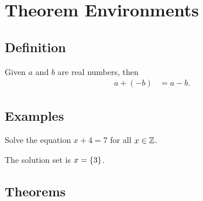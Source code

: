 \chapter{Theorem Environments}

\section{Definition}

\begin{definition}
\label{0000}
Given \( a \) and \( b \) are real numbers, then\cite{wolframMathworld-list}
\cite{Olson2021}
\begin{align*}
    a + (-b) &= a - b.
\end{align*}
\end{definition}

\section{Examples}

\begin{example}
\label{0001}
Solve the equation \( x + 4 = 7 \) for all \( x \in \mathbb{Z} \).
\end{example}
\begin{solution}
The solution set is \( x = \left\{3\right\} \).
\end{solution}

\section{Theorems}

